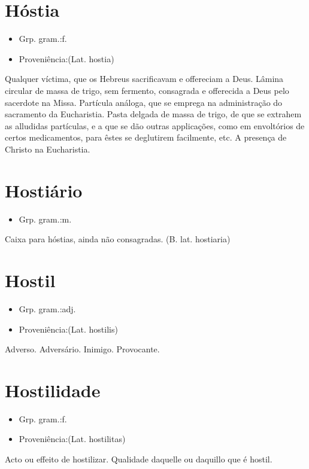 \documentclass{article}
\begin{document}
\section{Hóstia}
\begin{itemize}
\item {Grp. gram.:f.}
\end{itemize}
\begin{itemize}
\item {Proveniência:(Lat. \textunderscore hostia\textunderscore )}
\end{itemize}
Qualquer víctima, que os Hebreus sacrificavam e offereciam a Deus.
Lâmina circular de massa de trigo, sem fermento, consagrada e offerecida a Deus pelo sacerdote na Missa.
Partícula análoga, que se emprega na administração do sacramento da Eucharistia.
Pasta delgada de massa de trigo, de que se extrahem as alludidas partículas, e a que se dão outras applicações, como em envoltórios de certos medicamentos, para êstes se deglutirem facilmente, etc.
A presença de Christo na Eucharistia.
\section{Hostiário}
\begin{itemize}
\item {Grp. gram.:m.}
\end{itemize}
Caixa para hóstias, ainda não consagradas.
(B. lat. \textunderscore hostiaria\textunderscore )
\section{Hostil}
\begin{itemize}
\item {Grp. gram.:adj.}
\end{itemize}
\begin{itemize}
\item {Proveniência:(Lat. \textunderscore hostilis\textunderscore )}
\end{itemize}
Adverso.
Adversário.
Inimigo.
Provocante.
\section{Hostilidade}
\begin{itemize}
\item {Grp. gram.:f.}
\end{itemize}
\begin{itemize}
\item {Proveniência:(Lat. \textunderscore hostilitas\textunderscore )}
\end{itemize}
Acto ou effeito de hostilizar.
Qualidade daquelle ou daquillo que é hostil.
\end{document}
